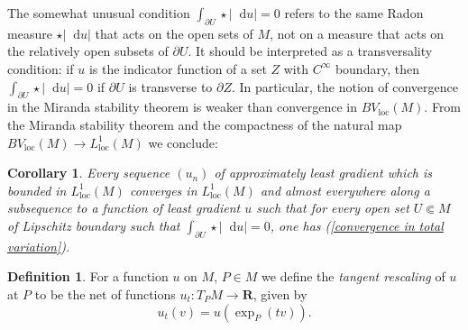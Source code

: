 \documentclass[reqno,11pt]{amsart}
\newcommand{\RR}{\mathbf{R}}
\newcommand*\dif{\mathop{}\!\mathrm{d}}
\newcommand{\dfn}[1]{\emph{#1}\index{#1}}
\newcommand{\loc}{\mathrm{loc}}
\newtheorem{corollary}[theorem]{Corollary}
\theoremstyle{definition}
\newtheorem{definition}[theorem]{Definition}
\numberwithin{equation}{section}
\begin{document}
The somewhat unusual condition $\int_{\partial U} \star |\dif u| = 0$ refers to the same Radon measure $\star |\dif u|$ that acts on the open sets of $M$, not on a measure that acts on the relatively open subsets of $\partial U$.
It should be interpreted as a transversality condition: if $u$ is the indicator function of a set $Z$ with $C^\infty$ boundary, then $\int_{\partial U} \star |\dif u| = 0$ if $\partial U$ is transverse to $\partial Z$.
In particular, the notion of convergence in the Miranda stability theorem is weaker than convergence in $BV_\loc(M)$.
From the Miranda stability theorem and the compactness of the natural map $BV_\loc(M) \to L^1_\loc(M)$ we conclude:

\begin{corollary}\label{compactness}
Every sequence $(u_n)$ of approximately least gradient which is bounded in $L^1_\loc(M)$ converges in $L^1_\loc(M)$ and almost everywhere along a subsequence to a function of least gradient $u$ such that for every open set $U \Subset M$ of Lipschitz boundary such that $\int_{\partial U} \star |\dif u| = 0$, one has (\ref{convergence in total variation}).
\end{corollary}

\begin{definition}
For a function $u$ on $M$, $P \in M$ we define the \dfn{tangent rescaling} of $u$ at $P$ to be the net of functions $u_t: T_PM \to \RR$, given by
$$u_t(v) = u\left(\exp_P(tv)\right).$$
\end{definition}
\end{document}
